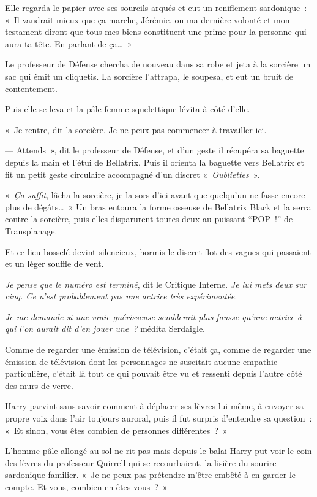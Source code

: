 Elle regarda le papier avec ses sourcils arqués et eut un reniflement sardonique~: «~Il vaudrait mieux que ça marche, Jérémie, ou ma dernière volonté et mon testament diront que tous mes biens constituent une prime pour la personne qui aura ta tête.
En parlant de ça…~»

Le professeur de Défense chercha de nouveau dans sa robe et jeta à la sorcière un sac qui émit un cliquetis.
La sorcière l'attrapa, le soupesa, et eut un bruit de contentement.

Puis elle se leva et la pâle femme squelettique lévita à côté d'elle.

«~Je rentre, dit la sorcière.
Je ne peux pas commencer à travailler ici.

--- Attends~», dit le professeur de Défense, et d'un geste il récupéra sa baguette depuis la main et l'étui de Bellatrix.
Puis il orienta la baguette vers Bellatrix et fit un petit geste circulaire accompagné d'un discret «~\emph{Oubliettes}~».

«~\emph{Ça suffit}, lâcha la sorcière, je la sors d'ici avant que quelqu'un ne fasse encore plus de dégâts…~»
 Un bras entoura la forme osseuse de Bellatrix Black et la serra contre la sorcière, puis elles disparurent toutes deux au puissant “POP~!” de Transplanage.

Et ce lieu bosselé devint silencieux, hormis le discret flot des vagues qui passaient et un léger souffle de vent.

\emph{Je pense que le numéro est terminé}, dit le Critique Interne.
\emph{Je lui mets deux sur cinq.
Ce n'est probablement pas une actrice très expérimentée.}

\emph{Je me demande si une vraie guérisseuse semblerait plus fausse qu'une actrice à qui l'on aurait dit d'en jouer une~?} médita Serdaigle.

Comme de regarder une émission de télévision, c'était ça, comme de regarder une émission de télévision dont les personnages ne suscitait aucune empathie particulière, c'était là tout ce qui pouvait être vu et ressenti depuis l'autre côté des murs de verre.

Harry parvint sans savoir comment à déplacer ses lèvres lui-même, à envoyer sa propre voix dans l'air toujours auroral, puis il fut surpris d'entendre sa question~: «~Et sinon, vous êtes combien de personnes différentes~?~»

L'homme pâle allongé au sol ne rit pas mais depuis le balai Harry put voir le coin des lèvres du professeur Quirrell qui se recourbaient, la lisière du sourire sardonique familier.
«~Je ne peux pas prétendre m'être embêté à en garder le compte.
Et vous, combien en êtes-vous~?~»

